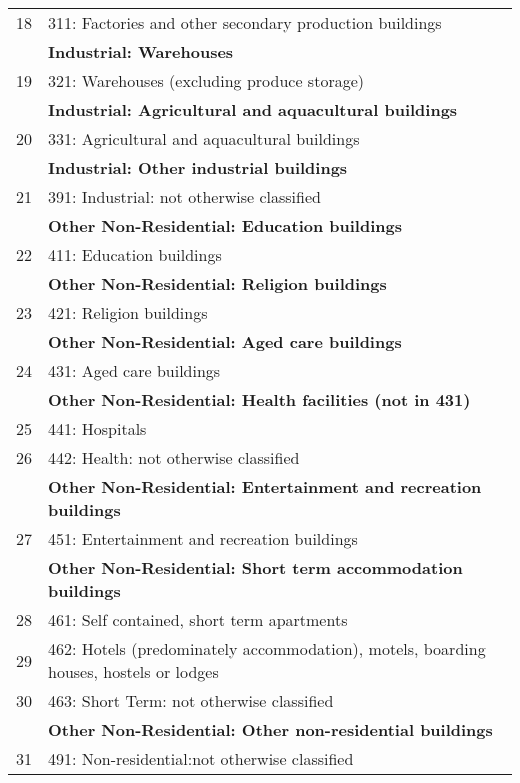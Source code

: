 \begin{table}
{\begin{tabular}{|c|p{}|}
18 & 311:  Factories and other secondary production buildings \\
& \textbf{Industrial: Warehouses} \\
19 & 321:  Warehouses (excluding produce storage) \\
& \textbf{Industrial: Agricultural and aquacultural buildings} \\
20 & 331:  Agricultural and aquacultural buildings \\
& \textbf{Industrial: Other industrial buildings} \\
21 & 391:  Industrial: not otherwise classified\\
\hline
& \textbf{Other Non-Residential: Education buildings} \\
22 & 411:  Education buildings \\
& \textbf{Other Non-Residential: Religion buildings} \\
23 & 421:  Religion buildings \\
& \textbf{Other Non-Residential: Aged care buildings} \\
24 & 431:  Aged care buildings \\
& \textbf{Other Non-Residential: Health facilities (not in 431)} \\
25 & 441:  Hospitals \\
26 & 442:  Health: not otherwise classified\\
& \textbf{Other Non-Residential: Entertainment and recreation buildings} \\
27 & 451:  Entertainment and recreation buildings \\
& \textbf{Other Non-Residential: Short term accommodation buildings} \\
28 & 461:  Self contained, short term apartments\\
29 & 462:  Hotels (predominately accommodation), motels, boarding houses, hostels or lodges\\
30 & 463:  Short Term: not otherwise classified\\
& \textbf{Other Non-Residential: Other non-residential buildings} \\
31 & 491:  Non-residential:not otherwise classified\\
\hline
\end{tabular}
}
\end{table}


